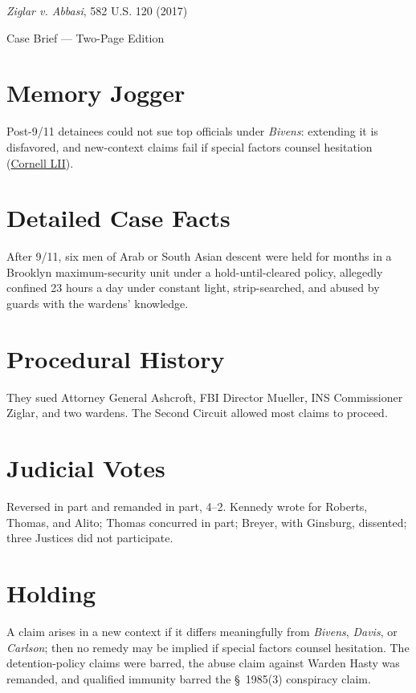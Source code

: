 \documentclass[12pt]{article}
\begin{document}
\begin{center}
{\LARGE \textit{Ziglar v. Abbasi}, 582 U.S. 120 (2017)\par}
\vspace{0.5em}
{\large Case Brief --- Two-Page Edition\par}
\end{center}

\section{Memory Jogger}
Post-9/11 detainees could not sue top officials under \textit{Bivens}: extending it is disfavored, and new-context claims fail if special factors counsel hesitation (\href{https://www.law.cornell.edu/supremecourt/text/15-1358}{Cornell LII}).

\section{Detailed Case Facts}
After 9/11, six men of Arab or South Asian descent were held for months in a Brooklyn maximum-security unit under a hold-until-cleared policy, allegedly confined 23 hours a day under constant light, strip-searched, and abused by guards with the wardens' knowledge.

\section{Procedural History}
They sued Attorney General Ashcroft, FBI Director Mueller, INS Commissioner Ziglar, and two wardens. The Second Circuit allowed most claims to proceed.

\section{Judicial Votes}
Reversed in part and remanded in part, 4--2. Kennedy wrote for Roberts, Thomas, and Alito; Thomas concurred in part; Breyer, with Ginsburg, dissented; three Justices did not participate.

\section{Holding}
A claim arises in a new context if it differs meaningfully from \textit{Bivens}, \textit{Davis}, or \textit{Carlson}; then no remedy may be implied if special factors counsel hesitation. The detention-policy claims were barred, the abuse claim against Warden Hasty was remanded, and qualified immunity barred the \S~1985(3) conspiracy claim.
\end{document}
